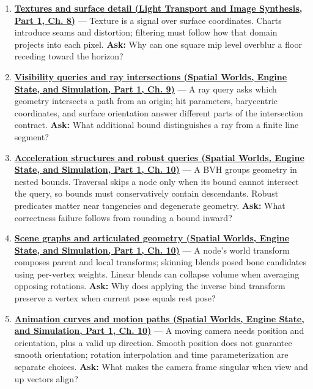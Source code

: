 \begin{enumerate}
\item
  \textbf{\href{../04-Light-Transport-and-Image-Synthesis-P01/main.pdf\#nameddest=03-visual-computing-i-ch019-textures-and-surface-detail}{Textures and surface detail (Light Transport and Image Synthesis, Part 1, Ch. 8)}} --- Texture is a signal over surface coordinates. Charts introduce seams and distortion; filtering must follow how that domain projects into each pixel. \textbf{Ask:} Why can one square mip level overblur a floor receding toward the horizon?
\item
  \textbf{\href{../05-Spatial-Worlds-Engine-State-and-Simulation-P01/main.pdf\#nameddest=04-visual-computing-ii-ch028-visibility-queries-and-ray-intersections-1}{Visibility queries and ray intersections (Spatial Worlds, Engine State, and Simulation, Part 1, Ch. 9)}} --- A ray query asks which geometry intersects a path from an origin; hit parameters, barycentric coordinates, and surface orientation answer different parts of the intersection contract. \textbf{Ask:} What additional bound distinguishes a ray from a finite line segment?
\item
  \textbf{\href{../05-Spatial-Worlds-Engine-State-and-Simulation-P01/main.pdf\#nameddest=04-visual-computing-ii-ch029-acceleration-structures-and-robust-queries-1}{Acceleration structures and robust queries (Spatial Worlds, Engine State, and Simulation, Part 1, Ch. 10)}} --- A BVH groups geometry in nested bounds. Traversal skips a node only when its bound cannot intersect the query, so bounds must conservatively contain descendants. Robust predicates matter near tangencies and degenerate geometry. \textbf{Ask:} What correctness failure follows from rounding a bound inward?
\item
  \textbf{\href{../05-Spatial-Worlds-Engine-State-and-Simulation-P01/main.pdf\#nameddest=04-visual-computing-ii-ch029-scene-graphs-and-articulated-geometry}{Scene graphs and articulated geometry (Spatial Worlds, Engine State, and Simulation, Part 1, Ch. 10)}} --- A node's world transform composes parent and local transforms; skinning blends posed bone candidates using per-vertex weights. Linear blends can collapse volume when averaging opposing rotations. \textbf{Ask:} Why does applying the inverse bind transform preserve a vertex when current pose equals rest pose?
\item
  \textbf{\href{../05-Spatial-Worlds-Engine-State-and-Simulation-P01/main.pdf\#nameddest=04-visual-computing-ii-ch029-animation-curves-and-motion-paths}{Animation curves and motion paths (Spatial Worlds, Engine State, and Simulation, Part 1, Ch. 10)}} --- A moving camera needs position and orientation, plus a valid up direction. Smooth position does not guarantee smooth orientation; rotation interpolation and time parameterization are separate choices. \textbf{Ask:} What makes the camera frame singular when view and up vectors align?

\end{enumerate}
